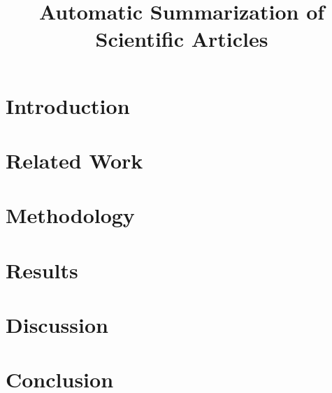 \documentclass[12pt]{scrreprt}
\title{Automatic Summarization of Scientific Articles}
\date{}
\begin{document}
\maketitle

\tableofcontents

\begin{abstract}

\end{abstract}

\chapter{Introduction}
\label{section:introduction}


\chapter{Related Work}
\label{section:related work}


\chapter{Methodology}
\label{section: method}


\chapter{Results}
\label{section:experiments}


\chapter{Discussion}
\label{section:discussion}


\chapter*{Conclusion}
\label{section:conclusion}






\end{document}
